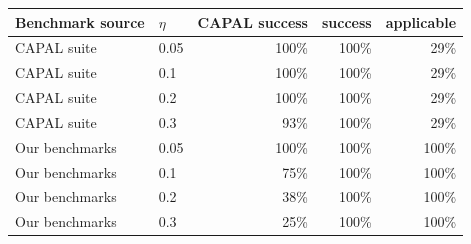 \begin{tabular}{llrrr}
\toprule
Benchmark source & $\eta$ & CAPAL success & \ours{} success & \ours{} applicable \\
\midrule
CAPAL suite & 0.05 & 100\% & 100\% & 29\% \\
CAPAL suite & 0.1 & 100\% & 100\% & 29\% \\
CAPAL suite & 0.2 & 100\% & 100\% & 29\% \\
CAPAL suite & 0.3 & 93\% & 100\% & 29\% \\
Our benchmarks & 0.05 & 100\% & 100\% & 100\% \\
Our benchmarks & 0.1 & 75\% & 100\% & 100\% \\
Our benchmarks & 0.2 & 38\% & 100\% & 100\% \\
Our benchmarks & 0.3 & 25\% & 100\% & 100\% \\
\bottomrule
\end{tabular}
